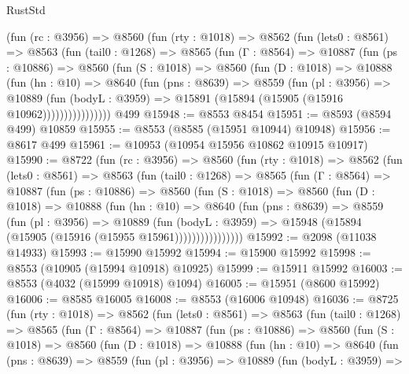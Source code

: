 \begin{lexlean}{RustStd}
\begin{coremodule}
      (fun (rc : @3956) =>
      @8560
        (fun (rty : @1018) =>
        @8562
          (fun (lets0 : @8561) =>
          @8563
            (fun (tail0 : @1268) =>
            @8565
              (fun (Γ : @8564) =>
              @10887
                (fun (ps : @10886) =>
                @8560
                  (fun (S : @1018) =>
                  @8560
                    (fun (D : @1018) =>
                    @10888
                      (fun (hn : @10) =>
                      @8640
                        (fun (pns : @8639) =>
                        @8559
                          (fun (pl : @3956) =>
                          @10889
                            (fun (bodyL : @3959) =>
                            @15891 (@15894 (@15905 (@15916 @10962))))))))))))))))
    @499
@15948 := @8553 @8454
@15951 := @8593 (@8594 @499) @10859
@15955 := @8553 (@8585 (@15951 @10944) @10948)
@15956 := @8617 @499
@15961 := @10953 (@10954 @15956 @10862 @10915 @10917)
@15990 := @8722
    (fun (rc : @3956) =>
    @8560
      (fun (rty : @1018) =>
      @8562
        (fun (lets0 : @8561) =>
        @8563
          (fun (tail0 : @1268) =>
          @8565
            (fun (Γ : @8564) =>
            @10887
              (fun (ps : @10886) =>
              @8560
                (fun (S : @1018) =>
                @8560
                  (fun (D : @1018) =>
                  @10888
                    (fun (hn : @10) =>
                    @8640
                      (fun (pns : @8639) =>
                      @8559
                        (fun (pl : @3956) =>
                        @10889
                          (fun (bodyL : @3959) =>
                          @15948 (@15894 (@15905 (@15916 (@15955 @15961))))))))))))))))
@15992 := @2098 (@11038 @14933)
@15993 := @15990 @15992
@15994 := @15900 @15992
@15998 := @8553 (@10905 (@15994 @10918) @10925)
@15999 := @15911 @15992
@16003 := @8553 (@4032 (@15999 @10918) @1094)
@16005 := @15951 (@8600 @15992)
@16006 := @8585 @16005
@16008 := @8553 (@16006 @10948)
@16036 := @8725
    (fun (rty : @1018) =>
    @8562
      (fun (lets0 : @8561) =>
      @8563
        (fun (tail0 : @1268) =>
        @8565
          (fun (Γ : @8564) =>
          @10887
            (fun (ps : @10886) =>
            @8560
              (fun (S : @1018) =>
              @8560
                (fun (D : @1018) =>
                @10888
                  (fun (hn : @10) =>
                  @8640
                    (fun (pns : @8639) =>
                    @8559
                      (fun (pl : @3956) =>
                      @10889
                        (fun (bodyL : @3959) =>

\end{coremodule}
\end{lexlean}
